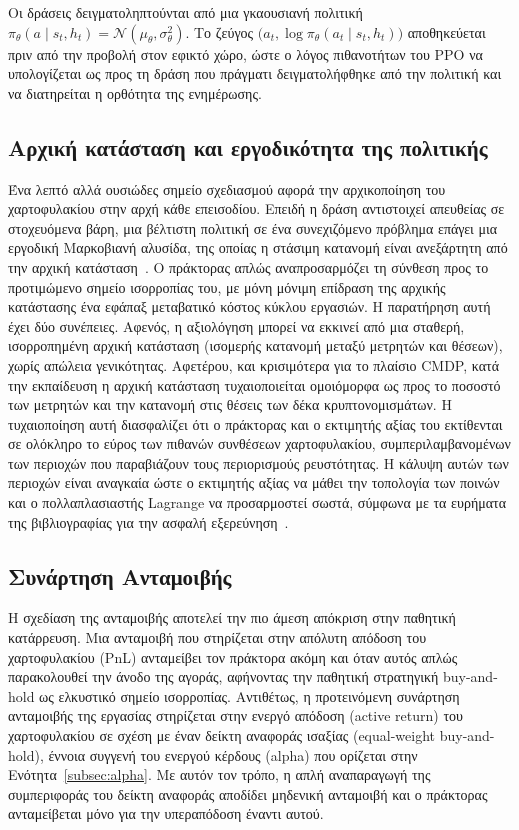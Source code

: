 Οι δράσεις δειγματοληπτούνται από μια γκαουσιανή πολιτική
$\pi_\theta(a \mid s_t, h_t) = \mathcal{N}(\mu_\theta, \sigma^2_\theta)$. Το
ζεύγος $\bigl(a_t, \log \pi_\theta(a_t \mid s_t, h_t)\bigr)$ αποθηκεύεται πριν
από την προβολή στον εφικτό χώρο, ώστε ο λόγος πιθανοτήτων του PPO να
υπολογίζεται ως προς τη δράση που πράγματι δειγματολήφθηκε από την πολιτική και
να διατηρείται η ορθότητα της ενημέρωσης.

\subsection{Αρχική κατάσταση και εργοδικότητα της πολιτικής}
\label{sec:start_state_effectiveness}

Ένα λεπτό αλλά ουσιώδες σημείο σχεδιασμού αφορά την αρχικοποίηση του
χαρτοφυλακίου στην αρχή κάθε επεισοδίου. Επειδή η δράση αντιστοιχεί απευθείας
σε στοχευόμενα βάρη, μια βέλτιστη πολιτική σε ένα συνεχιζόμενο πρόβλημα επάγει
μια εργοδική Μαρκοβιανή αλυσίδα, της οποίας η στάσιμη κατανομή είναι
ανεξάρτητη από την αρχική κατάσταση~\cite{sutton2018rl}. Ο πράκτορας απλώς
αναπροσαρμόζει τη σύνθεση προς το προτιμώμενο σημείο ισορροπίας του, με μόνη
μόνιμη επίδραση της αρχικής κατάστασης ένα εφάπαξ μεταβατικό κόστος κύκλου
εργασιών. Η παρατήρηση αυτή έχει δύο συνέπειες. Αφενός, η αξιολόγηση μπορεί να
εκκινεί από μια σταθερή, ισορροπημένη αρχική κατάσταση (ισομερής κατανομή
μεταξύ μετρητών και θέσεων), χωρίς απώλεια γενικότητας. Αφετέρου, και
κρισιμότερα για το πλαίσιο CMDP, κατά την εκπαίδευση η αρχική κατάσταση
τυχαιοποιείται ομοιόμορφα ως προς το ποσοστό των μετρητών και την κατανομή
στις θέσεις των δέκα κρυπτονομισμάτων. Η τυχαιοποίηση αυτή διασφαλίζει ότι ο
πράκτορας και ο εκτιμητής αξίας του εκτίθενται σε ολόκληρο το εύρος των
πιθανών συνθέσεων χαρτοφυλακίου, συμπεριλαμβανομένων των περιοχών που
παραβιάζουν τους περιορισμούς ρευστότητας. Η κάλυψη αυτών των περιοχών είναι
αναγκαία ώστε ο εκτιμητής αξίας να μάθει την τοπολογία των ποινών και ο
πολλαπλασιαστής Lagrange να προσαρμοστεί σωστά, σύμφωνα με τα ευρήματα της
βιβλιογραφίας για την ασφαλή εξερεύνηση~\cite{garcia2015safe,tessler2018rcpo}.

\subsection{Συνάρτηση Ανταμοιβής}
\label{sec:reward}

Η σχεδίαση της ανταμοιβής αποτελεί την πιο άμεση απόκριση στην παθητική
κατάρρευση. Μια ανταμοιβή που στηρίζεται στην απόλυτη απόδοση του
χαρτοφυλακίου (PnL) ανταμείβει τον πράκτορα ακόμη και όταν αυτός απλώς
παρακολουθεί την άνοδο της αγοράς, αφήνοντας την παθητική στρατηγική
buy-and-hold ως ελκυστικό σημείο ισορροπίας. Αντιθέτως, η προτεινόμενη συνάρτηση
ανταμοιβής της εργασίας στηρίζεται στην ενεργό απόδοση (active return) του
χαρτοφυλακίου σε σχέση με έναν δείκτη αναφοράς ισαξίας (equal-weight
buy-and-hold), έννοια συγγενή του ενεργού κέρδους (alpha) που ορίζεται
στην Ενότητα~\ref{subsec:alpha}. Με αυτόν τον τρόπο, η απλή αναπαραγωγή της συμπεριφοράς
του δείκτη αναφοράς αποδίδει μηδενική ανταμοιβή και ο πράκτορας ανταμείβεται
μόνο για την υπεραπόδοση έναντι αυτού.

